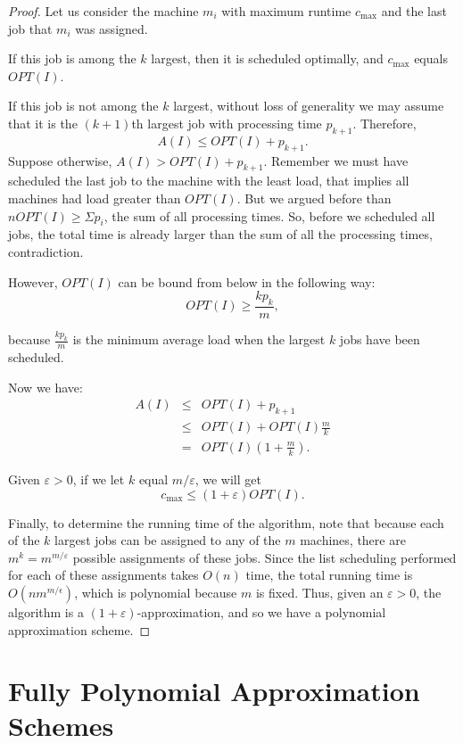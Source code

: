 \documentclass{article}
\begin{document}
\begin{proof}

Let us consider the machine $m_i$ with maximum runtime $c_{\max}$ and the last job that $m_i$ was
assigned.

If this job is among the $k$ largest, then it is scheduled optimally, and $c_{\max}$ equals
$OPT(I)$.

If this job is not among the $k$ largest, without loss of generality we may assume that it is the
$(k+1)$th largest job with processing time $p_{k+1}$. Therefore,
$$
A(I) \le OPT(I) + p_{k+1}.
$$
Suppose otherwise, $A(I) > OPT(I) + p_{k+1}$. Remember we must have scheduled the last job to the machine with the least load, that implies all machines had load greater than $OPT(I)$. But we argued before than $nOPT(I) \geq \Sigma p_i$, the sum of all processing times. So, before we scheduled all jobs, the total time is already larger than the sum of all the processing times, contradiction.

However, $OPT(I)$ can be bound from below in the following way:
$$
OPT(I) \ge \frac{k p_k}{m},
$$

because $\frac{k p_k}{m}$ is the minimum average load when the largest $k$ jobs have been
scheduled.

Now we have:
$$
\begin{array} {lcl}
A(I)    & \le & OPT(I) + p_{k+1} \\
        & \le & OPT(I) + OPT(I) \frac{m}{k} \\
        & = & OPT(I) \left( 1+\frac{m}{k} \right).
\end{array}
$$

Given $\varepsilon > 0$, if we let $k$ equal $m/\varepsilon$, we will get
$$
c_{\max} \le (1+\varepsilon) OPT(I).
$$

Finally, to determine the running time of the algorithm, note that because each of the $k$ largest
jobs can be assigned to any of the $m$ machines, there are $m^k = m^{m/\varepsilon}$ possible
assignments of these jobs. Since the list scheduling performed for each of these assignments takes
$O(n)$ time, the total running time is $O(nm^{m/\epsilon})$, which is polynomial because $m$ is
fixed. Thus, given an $\varepsilon >0$, the algorithm is a $(1+\varepsilon)$-approximation, and so
we have a polynomial approximation scheme.

\end{proof}

\section{Fully Polynomial Approximation Schemes}
\end{document}
